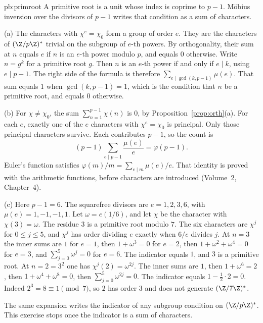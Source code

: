 \begin{solution}{pb:primroot}
\idea A primitive root is a unit whose index is coprime to $p-1$. Möbius inversion over the divisors of $p-1$ writes that condition as a sum of characters.

\writeup (a) The characters with $\chi^e=\chi_0$ form a group of order $e$. They are the characters of $(\Z/p\Z)^*$ trivial on the subgroup of $e$-th powers. By orthogonality, their sum at $n$ equals $e$ if $n$ is an $e$-th power modulo $p$, and equals $0$ otherwise. Write $n=g^k$ for a primitive root $g$. Then $n$ is an $e$-th power if and only if $e\mid k$, using $e\mid p-1$. The right side of the formula is therefore $\sum_{e\mid\gcd(k,p-1)}\mu(e)$. That sum equals $1$ when $\gcd(k,p-1)=1$, which is the condition that $n$ be a primitive root, and equals $0$ otherwise.

(b) For $\chi\ne\chi_0$, the sum $\sum_{n=1}^{p-1}\chi(n)$ is $0$, by Proposition~\ref{prop:orth}(a). For each $e$, exactly one of the $e$ characters with $\chi^e=\chi_0$ is principal. Only those principal characters survive. Each contributes $p-1$, so the count is
\[
(p-1)\sum_{e\mid p-1}\frac{\mu(e)}e=\varphi(p-1).
\]
Euler's function satisfies $\varphi(m)/m=\sum_{e\mid m}\mu(e)/e$. That identity is proved with the arithmetic functions, before characters are introduced (Volume~2, Chapter~4).

(c) Here $p-1=6$. The squarefree divisors are $e=1,2,3,6$, with $\mu(e)=1,-1,-1,1$. Let $\omega=e(1/6)$, and let $\chi$ be the character with $\chi(3)=\omega$. The residue $3$ is a primitive root modulo $7$. The six characters are $\chi^j$ for $0\le j\le5$, and $\chi^j$ has order dividing $e$ exactly when $6/e$ divides $j$. At $n=3$ the inner sums are $1$ for $e=1$, then $1+\omega^3=0$ for $e=2$, then $1+\omega^2+\omega^4=0$ for $e=3$, and $\sum_{j=0}^5\omega^j=0$ for $e=6$. The indicator equals $1$, and $3$ is a primitive root. At $n=2=3^2$ one has $\chi^j(2)=\omega^{2j}$. The inner sums are $1$, then $1+\omega^6=2$, then $1+\omega^4+\omega^8=0$, then $\sum_{j=0}^5\omega^{2j}=0$. The indicator equals $1-\frac12\cdot2=0$. Indeed $2^3=8\equiv1\pmod7$, so $2$ has order $3$ and does not generate $(\Z/7\Z)^*$.


\leads The same expansion writes the indicator of any subgroup condition on $(\Z/p\Z)^*$. This exercise stops once the indicator is a sum of characters.
\end{solution}


